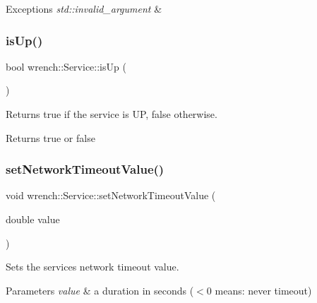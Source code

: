 \begin{DoxyExceptions}{Exceptions}
{\em std\+::invalid\+\_\+argument} & \\
\hline
\end{DoxyExceptions}
\mbox{\label{classwrench_1_1_service_a2549b97c1454e075ebadbb38563763e0}} 
\subsubsection{\texorpdfstring{is\+Up()}{isUp()}}
{\footnotesize\ttfamily bool wrench\+::\+Service\+::is\+Up (\begin{DoxyParamCaption}{ }\end{DoxyParamCaption})}



Returns true if the service is UP, false otherwise. 

\begin{DoxyReturn}{Returns}
true or false 
\end{DoxyReturn}
\mbox{\label{classwrench_1_1_service_a2bdf99201280d83b44a03c0b78ebdf90}} 
\subsubsection{\texorpdfstring{set\+Network\+Timeout\+Value()}{setNetworkTimeoutValue()}}
{\footnotesize\ttfamily void wrench\+::\+Service\+::set\+Network\+Timeout\+Value (\begin{DoxyParamCaption}\item[{double}]{value }\end{DoxyParamCaption})}



Sets the service\textquotesingle{}s network timeout value. 


\begin{DoxyParams}{Parameters}
{\em value} & a duration in seconds ($<$0 means\+: never timeout) \\
\hline
\end{DoxyParams}
\mbox{\label{classwrench_1_1_service_a77f35bdb636f0b6f819ae28135081ce8}} 
